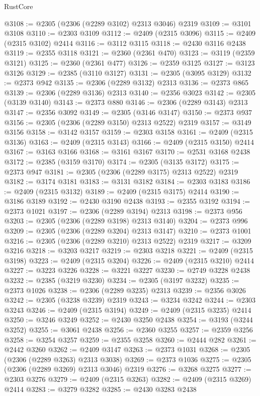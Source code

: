 \begin{lexlean}{RustCore}
\begin{coremodule}
@3108 := @2305 (@2306 (@2289 @3102) @2313 @3046) @2319
@3109 := @3101 @3108
@3110 := @2303 @3109
@3112 := @2409 (@2315 @3096)
@3115 := @2409 (@2315 @3102) @2414
@3116 := @3112 @3115
@3118 := @2430 @3116 @2438
@3119 := @2355 @3118
@3121 := @2360 (@2361 @470)
@3123 := @3119 (@2359 @3121)
@3125 := @2360 (@2361 @477)
@3126 := @2359 @3125
@3127 := @3123 @3126
@3129 := @2385 (@3110 @3127)
@3131 := @2305 (@3095 @3129)
@3132 := @2373 @942
@3135 := @2306 (@2289 @3132) @2313
@3136 := @2373 @865
@3139 := @2306 (@2289 @3136) @2313
@3140 := @2356 @3023
@3142 := @2305 (@3139 @3140)
@3143 := @2373 @880
@3146 := @2306 (@2289 @3143) @2313
@3147 := @2356 @3092
@3149 := @2305 (@3146 @3147)
@3150 := @2373 @937
@3156 := @2305 (@2306 (@2289 @3150) @2313 @2522) @2319
@3157 := @3149 @3156
@3158 := @3142 @3157
@3159 := @2303 @3158
@3161 := @2409 (@2315 @3136)
@3163 := @2409 (@2315 @3143)
@3166 := @2409 (@2315 @3150) @2414
@3167 := @3163 @3166
@3168 := @3161 @3167
@3170 := @2531 @3168 @2438
@3172 := @2385 (@3159 @3170)
@3174 := @2305 (@3135 @3172)
@3175 := @2373 @947
@3181 := @2305 (@2306 (@2289 @3175) @2313 @2522) @2319
@3182 := @3174 @3181
@3183 := @3131 @3182
@3184 := @2303 @3183
@3186 := @2409 (@2315 @3132)
@3189 := @2409 (@2315 @3175) @2414
@3190 := @3186 @3189
@3192 := @2430 @3190 @2438
@3193 := @2355 @3192
@3194 := @2373 @1021
@3197 := @2306 (@2289 @3194) @2313
@3198 := @2373 @956
@3203 := @2305 (@2306 (@2289 @3198) @2313 @3140)
@3204 := @2373 @996
@3209 := @2305 (@2306 (@2289 @3204) @2313 @3147)
@3210 := @2373 @1001
@3216 := @2305 (@2306 (@2289 @3210) @2313 @2522) @2319
@3217 := @3209 @3216
@3218 := @3203 @3217
@3219 := @2303 @3218
@3221 := @2409 (@2315 @3198)
@3223 := @2409 (@2315 @3204)
@3226 := @2409 (@2315 @3210) @2414
@3227 := @3223 @3226
@3228 := @3221 @3227
@3230 := @2749 @3228 @2438
@3232 := @2385 (@3219 @3230)
@3234 := @2305 (@3197 @3232)
@3235 := @2373 @1026
@3238 := @2306 (@2289 @3235) @2313
@3239 := @2356 @3026
@3242 := @2305 (@3238 @3239) @2319
@3243 := @3234 @3242
@3244 := @2303 @3243
@3246 := @2409 (@2315 @3194)
@3249 := @2409 (@2315 @3235) @2414
@3250 := @3246 @3249
@3252 := @2430 @3250 @2438
@3254 := @3193 (@3244 @3252)
@3255 := @3061 @2438
@3256 := @2360 @3255
@3257 := @2359 @3256
@3258 := @3254 @3257
@3259 := @2355 @3258
@3260 := @2444 @282
@3261 := @2442 @3260
@3262 := @2409 @3147
@3263 := @2373 @1031
@3268 := @2305 (@2306 (@2289 @3263) @2313 @3038)
@3269 := @2373 @1036
@3275 := @2305 (@2306 (@2289 @3269) @2313 @3046) @2319
@3276 := @3268 @3275
@3277 := @2303 @3276
@3279 := @2409 (@2315 @3263)
@3282 := @2409 (@2315 @3269) @2414
@3283 := @3279 @3282
@3285 := @2430 @3283 @2438

\end{coremodule}
\end{lexlean}
